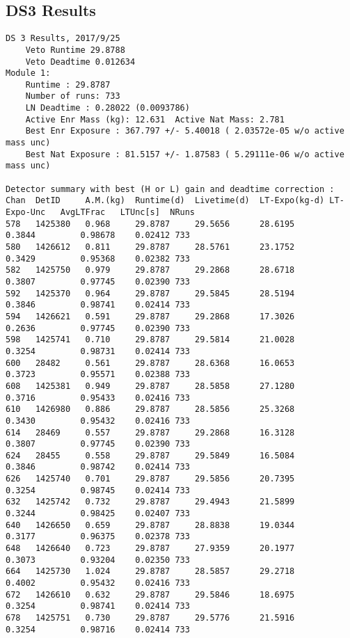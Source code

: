\documentclass[notitlepage,rmp,aps,10pt]{revtex4-1}
\begin{document}
\subsection{DS3 Results}
\begin{verbatim}
DS 3 Results, 2017/9/25
	Veto Runtime 29.8788
	Veto Deadtime 0.012634
Module 1:
	Runtime : 29.8787
	Number of runs: 733
	LN Deadtime : 0.28022 (0.0093786)
	Active Enr Mass (kg): 12.631  Active Nat Mass: 2.781
	Best Enr Exposure : 367.797 +/- 5.40018 ( 2.03572e-05 w/o active mass unc)
	Best Nat Exposure : 81.5157 +/- 1.87583 ( 5.29111e-06 w/o active mass unc)

Detector summary with best (H or L) gain and deadtime correction :
Chan  DetID     A.M.(kg)  Runtime(d)  Livetime(d)  LT-Expo(kg-d) LT-Expo-Unc   AvgLTFrac   LTUnc[s]  NRuns
578   1425380   0.968     29.8787     29.5656      28.6195        0.3844         0.98678    0.02412 733
580   1426612   0.811     29.8787     28.5761      23.1752        0.3429         0.95368    0.02382 733
582   1425750   0.979     29.8787     29.2868      28.6718        0.3807         0.97745    0.02390 733
592   1425370   0.964     29.8787     29.5845      28.5194        0.3846         0.98741    0.02414 733
594   1426621   0.591     29.8787     29.2868      17.3026        0.2636         0.97745    0.02390 733
598   1425741   0.710     29.8787     29.5814      21.0028        0.3254         0.98731    0.02414 733
600   28482     0.561     29.8787     28.6368      16.0653        0.3723         0.95571    0.02388 733
608   1425381   0.949     29.8787     28.5858      27.1280        0.3716         0.95433    0.02416 733
610   1426980   0.886     29.8787     28.5856      25.3268        0.3430         0.95432    0.02416 733
614   28469     0.557     29.8787     29.2868      16.3128        0.3807         0.97745    0.02390 733
624   28455     0.558     29.8787     29.5849      16.5084        0.3846         0.98742    0.02414 733
626   1425740   0.701     29.8787     29.5856      20.7395        0.3254         0.98745    0.02414 733
632   1425742   0.732     29.8787     29.4943      21.5899        0.3244         0.98425    0.02407 733
640   1426650   0.659     29.8787     28.8838      19.0344        0.3177         0.96375    0.02378 733
648   1426640   0.723     29.8787     27.9359      20.1977        0.3073         0.93204    0.02350 733
664   1425730   1.024     29.8787     28.5857      29.2718        0.4002         0.95432    0.02416 733
672   1426610   0.632     29.8787     29.5846      18.6975        0.3254         0.98741    0.02414 733
678   1425751   0.730     29.8787     29.5776      21.5916        0.3254         0.98716    0.02414 733

\end{verbatim}
\end{document}
